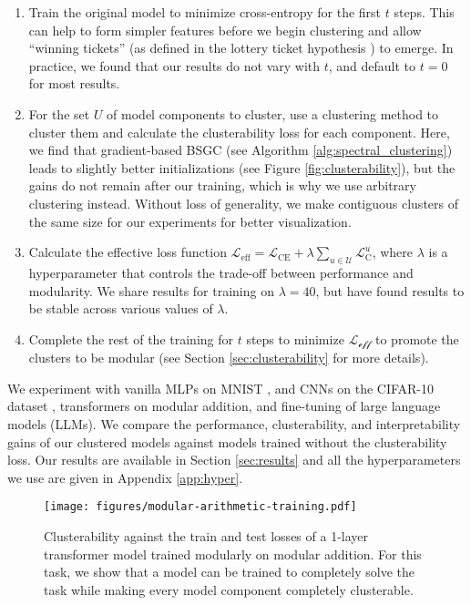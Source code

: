 \begin{enumerate}
    \item Train the original model to minimize cross-entropy for the first $t$ steps. This can help to form simpler features before we begin clustering and allow ``winning tickets'' (as defined in the lottery ticket hypothesis \citep{Frankle2018TheLT}) to emerge. In practice, we found that our results do not vary with $t$, and default to $t=0$ for most results.
    \item For the set $U$ of model components to cluster, use a clustering method to cluster them and calculate the clusterability loss for each component. Here, we find that gradient-based BSGC (see Algorithm \ref{alg:spectral_clustering}) leads to slightly better initializations (see Figure \ref{fig:clusterability}), but the gains do not remain after our training, which is why we use arbitrary clustering instead. Without loss of generality, we make contiguous clusters of the same size for our experiments for better visualization.
    \item Calculate the effective loss function $\mathcal{L}_{\text{eff}} = \mathcal{L}_{\text{CE}} + \lambda \displaystyle\sum_{u \in \mathcal{U}} \mathcal{L}_{\text{C}}^u$, where $\lambda$ is a hyperparameter that controls the trade-off between performance and modularity. We share results for training on $\lambda=40$, but have found results to be stable across various values of $\lambda$.
    \item Complete the rest of the training for $t$ steps to minimize $\mathcal{L_{\text{eff}}}$ to promote the clusters to be modular (see Section \ref{sec:clusterability} for more details).
\end{enumerate}

We experiment with vanilla MLPs on MNIST \citep{deng2012mnist}, and CNNs on the CIFAR-10 dataset \citep{krizhevsky2009learning}, transformers on modular addition, and fine-tuning of large language models (LLMs). We compare the performance, clusterability, and interpretability gains of our clustered models against models trained without the clusterability loss. Our results are available in Section \ref{sec:results} and all the hyperparameters we use are given in Appendix \ref{app:hyper}.

\begin{figure}[h]
\centering
    \texttt{[image: figures/modular-arithmetic-training.pdf]}
    \caption{Clusterability against the train and test losses of a 1-layer transformer model trained modularly on modular addition. For this task, we show that a model can be trained to completely solve the task while making every model component completely clusterable.}
    \label{fig:mod-mod-training}
\end{figure}

